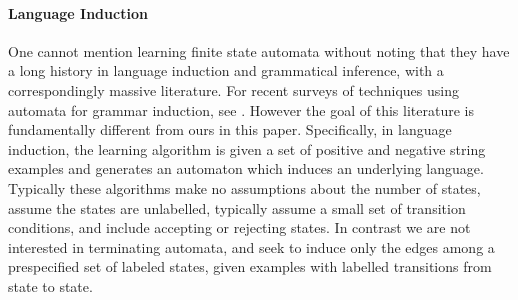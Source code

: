 \paragraph*{Language Induction}
One cannot mention learning finite state automata without noting that they have a long history in language induction and grammatical inference, with a correspondingly massive literature.  For recent surveys of techniques using automata for grammar induction, see \cite{Parekh00grammarinference, vidal}.  However the goal of this literature is fundamentally different from ours in this paper.  Specifically, in language induction, the learning algorithm is given a set of positive and negative string examples and generates an automaton which induces an underlying language.  Typically these algorithms make no assumptions about the number of states, assume the states are unlabelled, typically assume a small set of transition conditions, and include accepting or rejecting states.  In contrast we are not interested in terminating automata, and seek to induce only the edges among a prespecified set of labeled states, given examples with labelled transitions from state to state.
